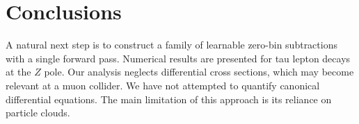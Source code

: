 \section{Conclusions}\label{sec:conclusions}

A natural next step is to construct a family of learnable zero-bin
subtractions with a single forward pass. Numerical results are presented
for tau lepton decays at the $Z$ pole. Our analysis neglects
differential cross sections, which may become relevant at a muon
collider. We have not attempted to quantify canonical differential
equations. The main limitation of this approach is its reliance on
particle clouds.


